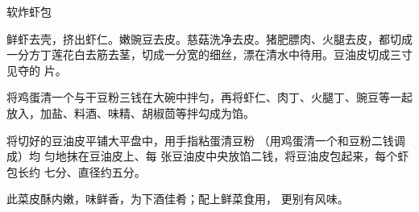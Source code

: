 \begin{recipe}{软炸虾包}

\ingredients


\cooking

\step 鲜虾去壳，挤出虾仁。嫩豌豆去皮。慈菇洗净去皮。猪肥膘肉、火腿去皮，都切成
一分方丁莲花白去筋去茎，切成一分宽的细丝，漂在清水中待用。豆油皮切成三寸见夺的
片。

\step 将鸡蛋清一个与干豆粉三钱在大碗中拌匀，再将虾仁、肉丁、火腿丁、豌豆等一起
放入，加盐、料酒、味精、胡椒茴等拌勾成为馅。

\step 将切好的豆油皮平铺大平盘中，用手指粘蛋清豆粉 （用鸡蛋清一个和豆粉二钱调
成）均 匀地抹在豆油皮上、每 张豆油皮中央放馅二钱，将豆油皮包起来，每个虾包长约
七分、直径约五分。

\notes

此菜皮酥内嫩，味鲜香，为下酒佳肴；配上鲜菜食用， 更别有风味。

\end{recipe}

